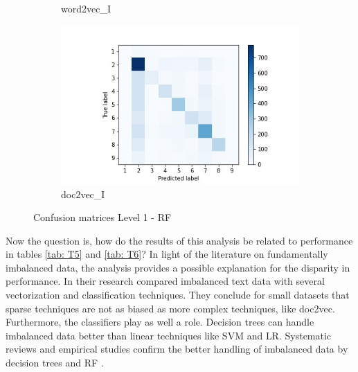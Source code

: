 \documentclass[12pt, a4paper, titlepage]{article}
\begin{document}
\begin{figure}
\begin{subfigure}[b]{0.475\textwidth}
    {{\small word2vec\_I}}    
  \end{subfigure}
  \hfill
  \begin{subfigure}[b]{0.475\textwidth}   
      \centering 
      \includegraphics[width=\textwidth]{cm_doc2vec_without_RF.jpg}
      {{\small doc2vec\_I}}    
  \end{subfigure}
  \caption{\label{fig: F20} Confusion matrices Level 1 - \ac{RF}}
\end{figure}

Now the question is, how do the results of this analysis be related to performance in tables \ref{tab: T5} and \ref{tab: T6}? In light of the literature on fundamentally imbalanced data, the analysis provides a possible explanation for the disparity in performance. In their research \citet{padurariu2019} compared imbalanced text data with several vectorization and classification techniques. They conclude for small datasets that sparse techniques are not as biased as more complex techniques, like doc2vec. Furthermore, the classifiers play as well a role. Decision trees can handle imbalanced data better than linear techniques like \ac{SVM} and \ac{LR}. Systematic reviews and empirical studies confirm the better handling of imbalanced data by decision trees and \ac{RF} \citep{kaur2019, muchlinski2016, krawczyk2016}. 
\end{document}
